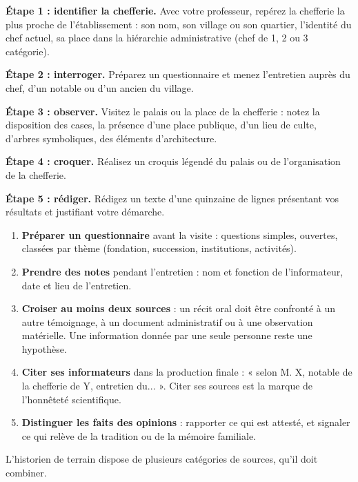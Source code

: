 \documentclass[11pt]{article}
\newcounter{popsec}
\newcounter{popsub}
\newcommand{\courssub}[1]{%
  \stepcounter{popsub}%
  \par\vspace{9pt}\noindent{\popxbold\fontsize{11.5}{13}\selectfont\color{popink}{\color{poporange}\thepopsec.\thepopsub}\hspace{6pt}#1}\par\nopagebreak\vspace{4pt}
}
\begin{document}
\textbf{Étape 1 : identifier la chefferie.} Avec votre professeur, repérez la chefferie la plus proche de l'établissement : son nom, son village ou son quartier, l'identité du chef actuel, sa place dans la hiérarchie administrative (chef de 1\iere{}, 2\ieme{} ou 3\ieme{} catégorie).

\textbf{Étape 2 : interroger.} Préparez un questionnaire et menez l'entretien auprès du chef, d'un notable ou d'un ancien du village.

\textbf{Étape 3 : observer.} Visitez le palais ou la place de la chefferie : notez la disposition des cases, la présence d'une place publique, d'un lieu de culte, d'arbres symboliques, des éléments d'architecture.

\textbf{Étape 4 : croquer.} Réalisez un croquis légendé du palais ou de l'organisation de la chefferie.

\textbf{Étape 5 : rédiger.} Rédigez un texte d'une quinzaine de lignes présentant vos résultats et justifiant votre démarche.

\begin{methode}
\begin{enumerate}
\item \textbf{Préparer un questionnaire} avant la visite : questions simples, ouvertes, classées par thème (fondation, succession, institutions, activités).
\item \textbf{Prendre des notes} pendant l'entretien : nom et fonction de l'informateur, date et lieu de l'entretien.
\item \textbf{Croiser au moins deux sources} : un récit oral doit être confronté à un autre témoignage, à un document administratif ou à une observation matérielle. Une information donnée par une seule personne reste une hypothèse.
\item \textbf{Citer ses informateurs} dans la production finale : « selon M. X, notable de la chefferie de Y, entretien du... ». Citer ses sources est la marque de l'honnêteté scientifique.
\item \textbf{Distinguer les faits des opinions} : rapporter ce qui est attesté, et signaler ce qui relève de la tradition ou de la mémoire familiale.
\end{enumerate}
\end{methode}

\courssub{Les sources mobilisables}

L'historien de terrain dispose de plusieurs catégories de sources, qu'il doit combiner.
\end{document}
